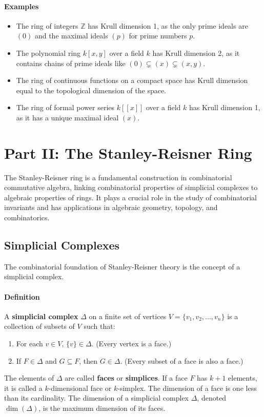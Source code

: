 \documentclass[12pt]{article}
\theoremstyle{definition}
\numberwithin{equation}{subsection}
\begin{document}
\paragraph{Examples}
\begin{itemize}
\item The ring of integers $\mathbb{Z}$ has Krull dimension 1, as the only prime ideals are $(0)$ and the maximal ideals $(p)$ for prime numbers $p$.
\item The polynomial ring $k[x,y]$ over a field $k$ has Krull dimension 2, as it contains chains of prime ideals like $(0) \subsetneq (x) \subsetneq (x,y)$.
\item The ring of continuous functions on a compact space has Krull dimension equal to the topological dimension of the space.
\item The ring of formal power series $k[[x]]$ over a field $k$ has Krull dimension 1, as it has a unique maximal ideal $(x)$.
\end{itemize}

\section*{Part II: The Stanley-Reisner Ring}

The Stanley-Reisner ring is a fundamental construction in combinatorial commutative algebra, linking combinatorial properties of simplicial complexes to algebraic properties of rings. It plays a crucial role in the study of combinatorial invariants and has applications in algebraic geometry, topology, and combinatorics.

\subsection{Simplicial Complexes}
The combinatorial foundation of Stanley-Reisner theory is the concept of a simplicial complex.

\paragraph{Definition}
A \textbf{simplicial complex} $\Delta$ on a finite set of vertices $V = \{v_1, v_2, \ldots, v_n\}$ is a collection of subsets of $V$ such that:
\begin{enumerate}
    \item For each $v \in V$, $\{v\} \in \Delta$. (Every vertex is a face.)
    \item If $F \in \Delta$ and $G \subseteq F$, then $G \in \Delta$. (Every subset of a face is also a face.)
\end{enumerate}
The elements of $\Delta$ are called \textbf{faces} or \textbf{simplices}. If a face $F$ has $k+1$ elements, it is called a $k$-dimensional face or $k$-simplex. The dimension of a face is one less than its cardinality. The dimension of a simplicial complex $\Delta$, denoted $\dim(\Delta)$, is the maximum dimension of its faces.
\end{document}
